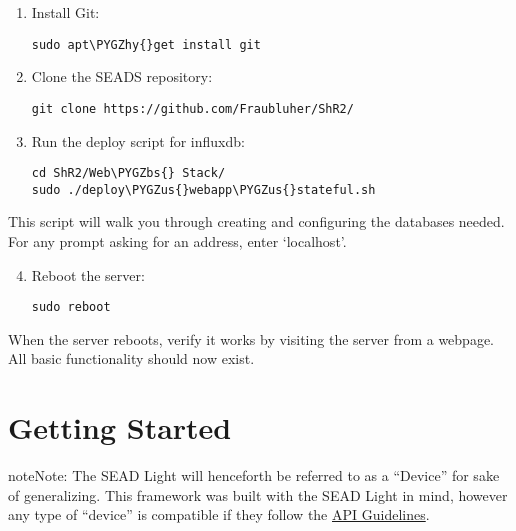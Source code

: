 \documentclass[letterpaper,10pt,english]{sphinxmanual}
\def\PYGZbs{\char`\\}
\def\PYGZus{\char`\_}
\def\PYGZhy{\char`\-}
\begin{document}
\begin{enumerate}
\item {} 
Install Git:

\begin{Verbatim}[commandchars=\\\{\}]
sudo apt\PYGZhy{}get install git
\end{Verbatim}

\item {} 
Clone the SEADS repository:

\begin{Verbatim}[commandchars=\\\{\}]
git clone https://github.com/Fraubluher/ShR2/
\end{Verbatim}

\item {} 
Run the deploy script for influxdb:

\begin{Verbatim}[commandchars=\\\{\}]
cd ShR2/Web\PYGZbs{} Stack/
sudo ./deploy\PYGZus{}webapp\PYGZus{}stateful.sh
\end{Verbatim}

\end{enumerate}

This script will walk you through creating and configuring the databases needed. For any prompt asking for an address, enter `localhost'.
\begin{enumerate}
\setcounter{enumi}{3}
\item {} 
Reboot the server:

\begin{Verbatim}[commandchars=\\\{\}]
sudo reboot
\end{Verbatim}

\end{enumerate}

When the server reboots, verify it works by visiting the server from a webpage. All basic functionality should now exist.


\chapter{Getting Started}
\label{getting-started:getting-started}\label{getting-started::doc}\label{getting-started:id1}
\begin{notice}{note}{Note:}
The SEAD Light will henceforth be referred to as a ``Device'' for sake of generalizing. This framework was built with the SEAD Light in mind, however any type of ``device'' is compatible if they follow the \href{http://seads.io/docs}{API Guidelines}.
\end{notice}
\end{document}
